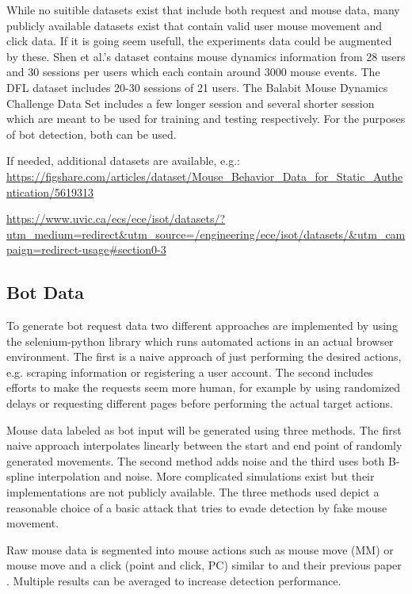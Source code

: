 \documentclass[
    fontsize=12pt,
    headings=small,
    parskip=half,           %
    bibliography=totoc,
    numbers=noenddot,       %
    open=any,               %
    final                   %
    ]{scrreprt}
\begin{document}
While no suitible datasets exist that include both request and mouse data, many publicly available datasets exist that contain valid user mouse movement and click data. If it is going seem usefull, the experiments data could be augmented by these.
Shen et al.'s \cite{6263955} dataset contains mouse dynamics information from 28 users and 30 sessions per users which each contain around 3000 mouse events.
The DFL dataset \cite{9111596} includes 20-30 sessions of 21 users.
The Balabit Mouse Dynamics Challenge Data Set \cite{BALABIT_CHALLENGE} includes a few longer session and several shorter session which are meant to be used for training and testing respectively. For the purposes of bot detection, both can be used.

If needed, additional datasets are available, e.g.:
\url{https://figshare.com/articles/dataset/Mouse_Behavior_Data_for_Static_Authentication/5619313}

\url{https://www.uvic.ca/ecs/ece/isot/datasets/?utm_medium=redirect&utm_source=/engineering/ece/isot/datasets/&utm_campaign=redirect-usage#section0-3}


\subsection{Bot Data}

To generate bot request data two different approaches are implemented by using the selenium-python \cite{SELENIUM_PYTHON} library which runs automated actions in an actual browser environment. The first is a naive approach of just performing the desired actions, e.g. scraping information or registering a user account. The second includes efforts to make the requests seem more human, for example by using randomized delays or requesting different pages before performing the actual target actions.

Mouse data labeled as bot input will be generated using three methods. The first naive approach interpolates linearly between the start and end point of randomly generated movements. The second method adds noise and the third uses both B-spline interpolation and noise. More complicated simulations exist but their implementations are not publicly available. \cite{8275816} \cite{Nazar2003} The three methods used depict a reasonable choice of a basic attack that tries to evade detection by fake mouse movement.

Raw mouse data is segmented into mouse actions such as mouse move (MM) or mouse move and a click (point and click, PC) similar to \cite{9111596} and their previous paper \cite{DBLP:journals/corr/abs-1810-04668}. Multiple results can be averaged to increase detection performance.
\end{document}
